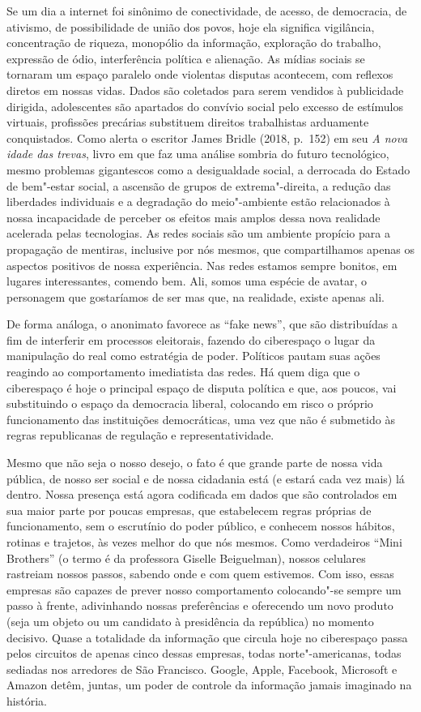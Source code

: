 Se um dia a internet foi sinônimo de conectividade, de acesso, de
democracia, de ativismo, de possibilidade de união dos povos, hoje ela
significa vigilância, concentração de riqueza, monopólio da informação,
exploração do trabalho, expressão de ódio, interferência política e
alienação. As mídias sociais se tornaram um espaço paralelo onde
violentas disputas acontecem, com reflexos diretos em nossas vidas.
Dados são coletados para serem vendidos à publicidade dirigida, adolescentes são apartados do convívio social pelo excesso de estímulos virtuais, profissões precárias substituem direitos trabalhistas arduamente conquistados.
Como alerta o escritor James Bridle (2018, p.~152) em seu \emph{A nova idade das trevas}, livro em que faz uma análise sombria do futuro tecnológico, mesmo problemas gigantescos como a desigualdade social, a derrocada do Estado de bem"-estar social, a ascensão de grupos de extrema"-direita, a redução das liberdades individuais e a degradação do meio"-ambiente estão relacionados à nossa incapacidade de perceber os efeitos mais amplos dessa nova realidade acelerada pelas tecnologias.
As redes sociais são um ambiente propício para a propagação de mentiras, inclusive por nós mesmos, que compartilhamos apenas os aspectos positivos de nossa experiência. Nas redes estamos sempre bonitos, em lugares interessantes, comendo bem. Ali, somos uma espécie de avatar, o personagem que gostaríamos de ser mas que, na realidade, existe apenas ali.

De forma análoga, o anonimato favorece as ``fake news'', que são distribuídas a fim de interferir em processos eleitorais, fazendo do ciberespaço o lugar da manipulação do real como estratégia de poder. Políticos pautam suas ações reagindo ao comportamento imediatista das redes. Há quem diga que o ciberespaço é hoje o principal espaço de disputa política e que, aos poucos, vai substituindo o espaço da democracia liberal, colocando em risco o próprio funcionamento das instituições democráticas, uma vez que não é submetido às regras republicanas de regulação e representatividade.

Mesmo que não seja o nosso desejo,
o fato é que grande parte de nossa vida pública, de nosso ser social e
de nossa cidadania está (e estará cada vez mais) lá dentro. Nossa
presença está agora codificada em dados que são controlados em sua maior
parte por poucas empresas, que estabelecem regras próprias de
funcionamento, sem o escrutínio do poder público, e conhecem nossos
hábitos, rotinas e trajetos, às vezes melhor do que nós mesmos. Como verdadeiros ``Mini Brothers'' (o termo é da professora Giselle Beiguelman), nossos celulares rastreiam nossos passos, sabendo onde e com quem estivemos. Com isso, essas empresas são
capazes de prever nosso comportamento colocando"-se sempre um passo à
frente, adivinhando nossas preferências e oferecendo um novo
produto (seja um objeto ou um candidato à presidência da república) no
momento decisivo. Quase a totalidade da informação que circula hoje no
ciberespaço passa pelos circuitos de apenas cinco dessas empresas, todas
norte"-americanas, todas sediadas nos arredores de São Francisco. Google,
Apple, Facebook, Microsoft e Amazon detêm, juntas, um poder de controle
da informação jamais imaginado na história.

